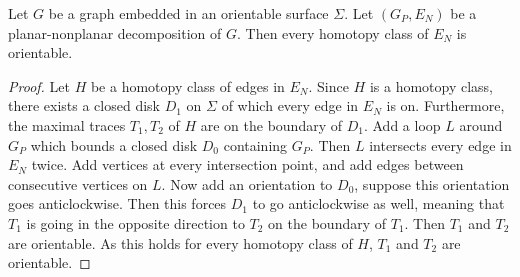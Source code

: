 \begin{lemma}\label{lem:orientable_traces}
	Let $G$ be a graph embedded in an orientable surface $\Sigma$. Let $(G_P, E_N)$ be a planar-nonplanar decomposition of $G$. Then every homotopy class of $E_N$ is orientable. 
\end{lemma}
\begin{proof}
	Let $H$ be a homotopy class of edges in $E_N$. Since $H$ is a homotopy class, there exists a closed disk $D_1$ on $\Sigma$ of which every edge in $E_N$ is on. Furthermore, the maximal traces $T_1, T_2$ of $H$ are on the boundary of $D_1$. Add a loop $L$ around $G_P$ which bounds a closed disk $D_0$ containing $G_P$. Then $L$ intersects every edge in $E_N$ twice. Add vertices at every intersection point, and add edges between consecutive vertices on $L$. Now add an orientation to $D_0$, suppose this orientation goes anticlockwise. Then this forces $D_1$ to go anticlockwise as well, meaning that $T_1$ is going in the opposite direction to $T_2$ on the boundary of $T_1$. Then $T_1$ and $T_2$ are orientable. As this holds for every homotopy class of $H$, $T_1$ and $T_2$ are orientable. 
\end{proof}

